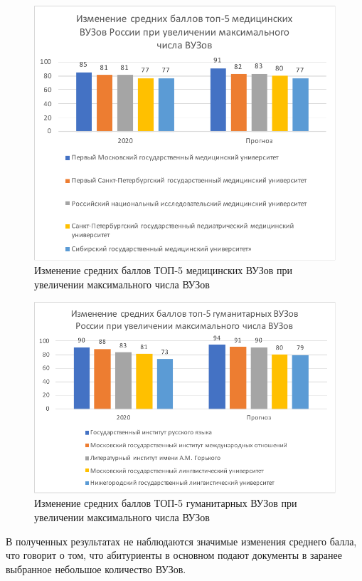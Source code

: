 \begin{figure}[hbtp]
	\centering
	\includegraphics[scale=1.0]{img/top5medmax.pdf.pdf}
	\caption{Изменение средних баллов ТОП-5 медицинских ВУЗов при увеличении максимального числа ВУЗов}
	\label{top5medmax}
\end{figure} 

\begin{figure}[hbtp]
	\centering
	\includegraphics[scale=1.0]{img/top5gymmax.pdf.pdf}
	\caption{Изменение средних баллов ТОП-5 гуманитарных ВУЗов при увеличении максимального числа ВУЗов}
	\label{top5gymmax}
\end{figure} 	

В полученных результатах не наблюдаются значимые изменения среднего балла, что говорит о том, что абитуриенты в основном подают документы в заранее выбранное небольшое количество ВУЗов.

